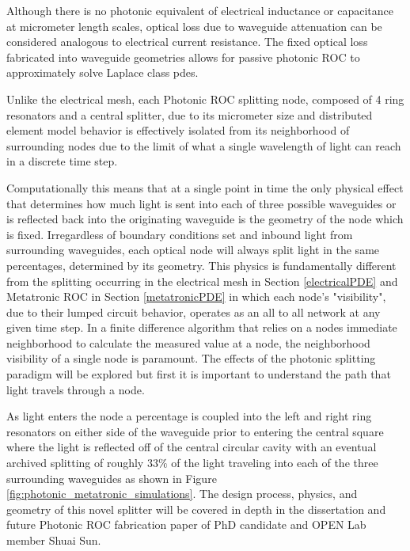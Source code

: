 \par Although there is no photonic equivalent of electrical inductance or capacitance at micrometer length scales, optical loss due to waveguide attenuation can be considered analogous to electrical current resistance. The fixed optical loss fabricated into waveguide geometries allows for passive photonic ROC to approximately solve Laplace class \acrshort{pde}s.

\par Unlike the electrical mesh, each Photonic ROC splitting node, composed of 4 ring resonators and a central splitter, due to its micrometer size and distributed element model behavior is effectively isolated from its neighborhood of surrounding nodes due to the limit of what a single wavelength of light can reach in a discrete time step. 

\par Computationally this means that at a single point in time the only physical effect that determines how much light is sent into each of three possible waveguides or is reflected back into the originating waveguide is the geometry of the node which is fixed. Irregardless of boundary conditions set and inbound light from surrounding waveguides, each optical node will always split light in the same percentages, determined by its geometry. This physics is fundamentally different from the splitting occurring in the electrical mesh in Section \ref{electricalPDE} and Metatronic ROC in Section \ref{metatronicPDE} in which each node's "visibility", due to their lumped circuit behavior, operates as an all to all network at any given time step. In a finite difference algorithm that relies on a nodes immediate neighborhood to calculate the measured value at a node, the neighborhood visibility of a single node is paramount. The effects of the photonic splitting paradigm will be explored but first it is important to understand the path that light travels through a node.

\par As light enters the node a percentage is coupled into the left and right ring resonators on either side of the waveguide prior to entering the central square where the light  is reflected off of the central circular cavity with an eventual archived splitting of roughly $33\%$ of the light traveling into each of the three surrounding waveguides as shown in Figure \ref{fig:photonic_metatronic_simulations}. The design process, physics, and geometry of this novel splitter will be covered in depth in the dissertation and future Photonic ROC fabrication paper of PhD candidate and OPEN Lab member Shuai Sun.

